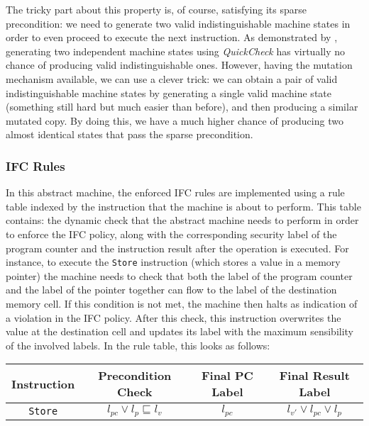 \documentclass[acmsmall, anonymous]{acmart}
\newcommand{\quickcheck}{\textit{QuickCheck}\xspace}
\begin{document}
The tricky part about this property is, of course, satisfying its sparse
precondition: we need to generate two valid indistinguishable machine states in
order to even proceed to execute the next instruction.
%
As demonstrated by \citeauthor{lampropoulos2019coverage}, generating two
independent machine states using \quickcheck has virtually no chance of
producing valid indistinguishable ones.
%
However, having the mutation mechanism available, we can use a clever trick: we
can obtain a pair of valid indistinguishable machine states by generating a
single valid machine state (something still hard but much easier than before),
and then producing a similar mutated copy.
%
By doing this, we have a much higher chance of producing two almost identical
states that pass the sparse precondition.

\subsubsection{IFC Rules}

In this abstract machine, the enforced IFC rules are implemented using a rule
table indexed by the instruction that the machine is about to perform.
%
This table contains: the dynamic check that the abstract machine needs to
perform in order to enforce the IFC policy, along with the corresponding
security label of the program counter and the instruction result after the
operation is executed.
%
For instance, to execute the \texttt{Store} instruction (which stores a value in
a memory pointer) the machine needs to check that both the label of the program
counter and the label of the pointer together can flow to the label of the
destination memory cell.
%
If this condition is not met, the machine then halts as indication of a
violation in the IFC policy.
%
After this check, this instruction overwrites the value at the destination cell
and updates its label with the maximum sensibility of the involved labels.
%
In the rule table, this looks as follows:

\begin{center}
\footnotesize
\begin{tabular}{|c|c|c|c|}
\hline
\textbf{Instruction}
& \textbf{Precondition Check}
& \textbf{Final PC Label}
& \textbf{Final Result Label} \\
\hline
\texttt{Store}
& $l_{pc} \vee l_{p} \sqsubseteq l_{v}$
& $l_{pc}$
& $l_{v'} \vee l_{pc} \vee l_{p}$ \\
\hline
\end{tabular}
\end{center}
\end{document}
